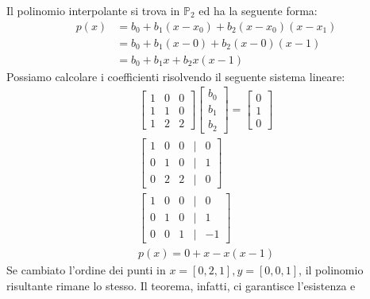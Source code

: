 \documentclass{article}
\begin{document}
\begin{example}
    Il polinomio interpolante si trova in $\mathbb{P}_2$ ed ha la
    seguente forma:
    \begin{equation*}
       \begin{aligned}
           p(x)&=b_0+b_1(x-x_0)+b_2(x-x_0)(x-x_1) \\ 
               &=b_0+b_1(x-0)+b_2(x-0)(x-1) \\ 
               &=b_0+b_1x+b_2x(x-1)
       \end{aligned} 
    \end{equation*}
    Possiamo calcolare i coefficienti risolvendo il seguente sistema lineare:
    \begin{equation*}
       \begin{aligned}
           \begin{bmatrix}
               1 & 0 & 0 \\ 
               1 & 1 & 0 \\ 
               1 & 2 & 2
           \end{bmatrix}
           \begin{bmatrix}
               b_0 \\ 
               b_1 \\ 
               b_2
           \end{bmatrix}=
           \begin{bmatrix}
               0 \\ 
               1 \\ 
               0
           \end{bmatrix}\\ 
           \begin{bmatrix}
               1 & 0 & 0 & | & 0\\
               0 & 1 & 0 & | & 1\\
               0 & 2 & 2 & | & 0
           \end{bmatrix}\\
           \begin{bmatrix}
               1 & 0 & 0 & | & 0\\
               0 & 1 & 0 & | & 1\\
               0 & 0 & 1 & | & -1
           \end{bmatrix}\\
           p(x)=0+x-x(x-1) 
       \end{aligned} 
    \end{equation*}
    Se cambiato l'ordine dei punti in $x=[0,2,1],y=[0,0,1]$, il polinomio
    risultante rimane lo stesso. Il teorema, infatti, ci garantisce l'esistenza e

\end{example}
\end{document}
